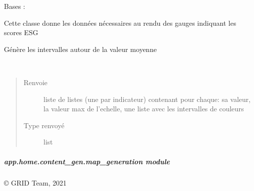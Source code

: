 \documentclass[letterpaper,10pt,french]{sphinxmanual}
\begin{document}
\begin{fulllineitems}
\label{\detokenize{app.home.content_gen:app.home.content_gen.index_renderer.Scoring}}
\sphinxAtStartPar
Bases : 

\sphinxAtStartPar
Cette classe donne les données nécessaires au rendu des gauges indiquant les scores ESG

\begin{fulllineitems}
\label{\detokenize{app.home.content_gen:app.home.content_gen.index_renderer.Scoring.bin}}
\sphinxAtStartPar
Génère les intervalles autour de la valeur moyenne

\end{fulllineitems}


\begin{fulllineitems}
\label{\detokenize{app.home.content_gen:app.home.content_gen.index_renderer.Scoring.main}}~\begin{quote}\begin{description}
\item[{Renvoie}] \leavevmode
\sphinxAtStartPar
liste de listes (une par indicateur) contenant pour chaque: sa valeur, la valeur max de l’echelle, une liste avec les intervalles de couleurs

\item[{Type renvoyé}] \leavevmode
\sphinxAtStartPar
list

\end{description}\end{quote}

\end{fulllineitems}


\end{fulllineitems}



\subparagraph{app.home.content\_gen.map\_generation module}
\label{\detokenize{app.home.content_gen:module-app.home.content_gen.map_generation}}\label{\detokenize{app.home.content_gen:app-home-content-gen-map-generation-module}}
\sphinxAtStartPar
© GRID Team, 2021
\end{document}
